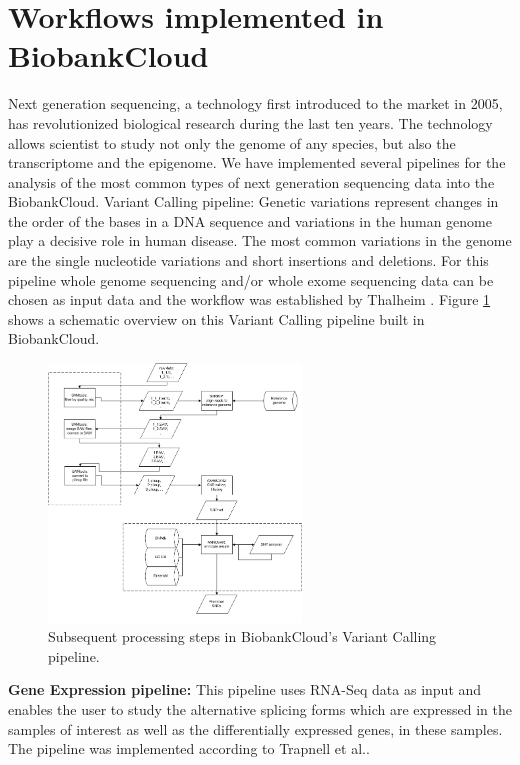 \section{Workflows implemented in BiobankCloud}
Next generation sequencing, a technology first introduced to the market in 2005, has revolutionized biological research during the last ten years. The technology allows scientist to study not only the genome of any species, but also the transcriptome and the epigenome.
We have implemented several pipelines for the analysis of the most common types of next generation sequencing data into the BiobankCloud. 
Variant Calling pipeline: Genetic variations represent changes in the order of the bases in a DNA sequence and variations in the human genome play a decisive role in human disease. The most common variations in the genome are the single nucleotide variations and short insertions and deletions. For this pipeline whole genome sequencing and/or whole exome sequencing data can be chosen as input data and the workflow was established by Thalheim \cite{snp_wf_thalheim}. Figure \ref{fig:workflow_snp} shows a schematic overview on this Variant Calling pipeline built in BiobankCloud.


\vskip-5pt
\begin{figure}[h]
\centering
\includegraphics[width=0.6\textwidth]{./imgs/wf_snp.png}
\caption{Subsequent processing steps in BiobankCloud's Variant Calling pipeline.}
\label{fig:workflow_snp}
\end{figure}
\vskip-5pt


\textbf{Gene Expression pipeline:} This pipeline uses RNA-Seq data as input and enables the user to study the alternative splicing forms which are expressed in the samples of interest as well as the differentially expressed genes, in these samples. The pipeline was implemented according to Trapnell et al.\cite{trapnell2012differential, trapnell2013differential}.

